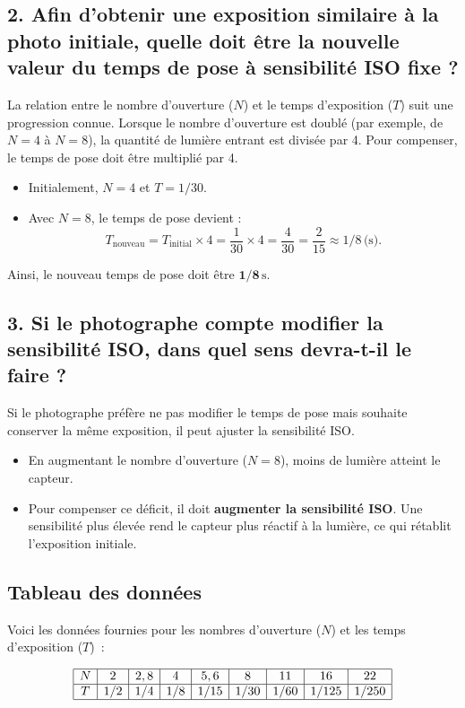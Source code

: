 \documentclass[answers]{exam}
\begin{document}
\subsection*{2. Afin d'obtenir une exposition similaire à la photo initiale, quelle doit être la nouvelle valeur du temps de pose à sensibilité ISO fixe ?}

La relation entre le nombre d'ouverture (\( N \)) et le temps d'exposition (\( T \)) suit une progression connue. Lorsque le nombre d'ouverture est doublé (par exemple, de \( N = 4 \) à \( N = 8 \)), la quantité de lumière entrant est divisée par 4. Pour compenser, le temps de pose doit être multiplié par 4.

\begin{itemize}
    \item Initialement, \( N = 4 \) et \( T = 1/30 \).
    \item Avec \( N = 8 \), le temps de pose devient :
    \[
    T_{\text{nouveau}} = T_{\text{initial}} \times 4 = \frac{1}{30} \times 4 = \frac{4}{30} = \frac{2}{15} \approx 1/8 \, \text{(s)}.
    \]
\end{itemize}
Ainsi, le nouveau temps de pose doit être \( \mathbf{1/8} \, \text{s} \).

\subsection*{3. Si le photographe compte modifier la sensibilité ISO, dans quel sens devra-t-il le faire ?}

Si le photographe préfère ne pas modifier le temps de pose mais souhaite conserver la même exposition, il peut ajuster la sensibilité ISO.

\begin{itemize}
    \item En augmentant le nombre d'ouverture (\( N = 8 \)), moins de lumière atteint le capteur.
    \item Pour compenser ce déficit, il doit \textbf{augmenter la sensibilité ISO}. Une sensibilité plus élevée rend le capteur plus réactif à la lumière, ce qui rétablit l'exposition initiale.
\end{itemize}

\subsection*{Tableau des données}

Voici les données fournies pour les nombres d'ouverture (\( N \)) et les temps d'exposition (\( T \)) :

\[
\begin{array}{|c|c|c|c|c|c|c|c|c|}
\hline
N & 2 & 2,8 & 4 & 5,6 & 8 & 11 & 16 & 22 \\
\hline
T & 1/2 & 1/4 & 1/8 & 1/15 & 1/30 & 1/60 & 1/125 & 1/250 \\
\hline
\end{array}
\]
\end{document}
